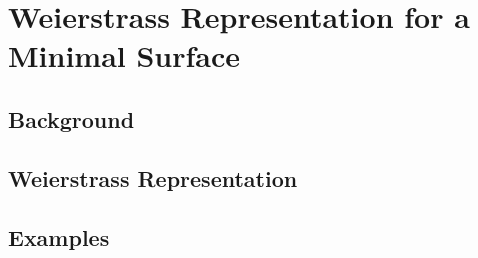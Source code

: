 \section{Weierstrass Representation for a Minimal Surface}

\subsection{Background}

\subsection{Weierstrass Representation}

\subsection{Examples}